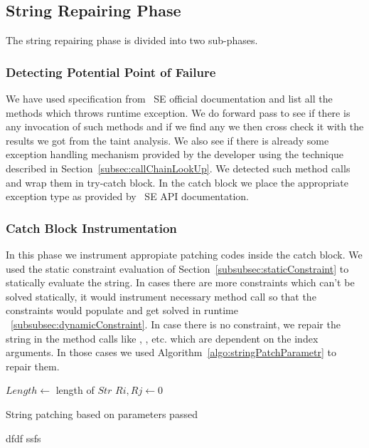 \subsection{String Repairing Phase}
\label{subsec:stringReepairing}

The string repairing phase is divided into two sub-phases.

\subsubsection{Detecting Potential Point of Failure}
\label{subsub:detectingFailure}

We have used specification from \java\ SE official documentation and list all
the methods which throws runtime exception. We do forward pass to see if there 
is any invocation of such methods and if we find any we then cross check it 
with the results we got from the taint analysis. We also see if there is already
some exception handling mechanism provided by the developer using the technique 
described in Section~\ref{subsec:callChainLookUp}. We detected such method calls
and wrap them in try-catch block. In the catch block we place the appropriate
exception type as provided by \java\ SE API documentation. 

\subsubsection{Catch Block Instrumentation}
\label{subsub:catchInstrumentation}

In this phase we instrument appropiate patching codes inside the catch block.
We used the static constraint evaluation of
Section~\ref{subsubsec:staticConstraint} to statically evaluate the string. In
cases there are more constraints which can't be solved statically, it would instrument
necessary method call so that the constraints would populate and get solved in runtime
~\ref{subsubsec:dynamicConstraint}. In case there is no constraint, we repair the
string in the method calls like , ,  etc.
which are dependent on the index arguments. In those cases we used
Algorithm~\ref{algo:stringPatchParametr} to repair them.


\begin{algorithm}
\scriptsize
\DontPrintSemicolon
{}
\Begin
{
	$Length \longleftarrow$ length of $Str$\;
	 {
		$Ri, Rj \longleftarrow 0$\;
	} 	
}
\caption{String patching based on parameters passed}
\label{algo:stringPatchParametr}
\end{algorithm}
dfdf
ssfs

